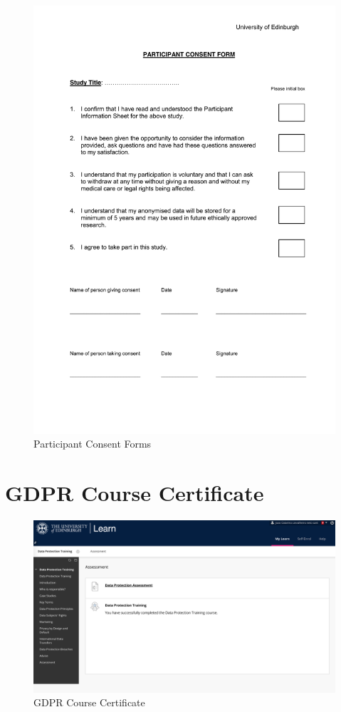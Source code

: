 \begin{figure}[H]
\centering
\includegraphics[width=\textwidth]{pdfs/consent}
\caption{Participant Consent Forms}
\label{consentform}
\end{figure}

\section{GDPR Course Certificate}
\label{sec:gdpr}

\begin{figure}[H]
\centering
\includegraphics[width=\textwidth]{images/gdpr}
\caption{GDPR Course Certificate}
\label{consentform}
\end{figure}
